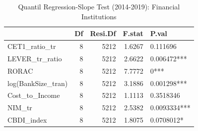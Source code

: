 \begin{table}[ht]
\centering
\caption{Quantil Regression-Slope Test (2014-2019): Financial Institutions} 
\begingroup\small
\begin{tabular}{lrrrl}
  \toprule
 & Df & Resi.Df & F.stat & P.val \\ 
  \midrule
CET1\_ratio\_tr & 8 & 5212 & 1.6267 & 0.111696 \\ 
  LEVER\_tr\_ratio & 8 & 5212 & 2.6622 & 0.006472*** \\ 
  RORAC & 8 & 5212 & 7.7772 & 0*** \\ 
  log(BankSize\_tran) & 8 & 5212 & 3.1886 & 0.001298*** \\ 
  Cost\_to\_Income & 8 & 5212 & 1.1113 & 0.3518346 \\ 
  NIM\_tr & 8 & 5212 & 2.5382 & 0.0093334*** \\ 
  CBDI\_index & 8 & 5212 & 1.8075 & 0.0708012* \\ 
   \bottomrule
\end{tabular}
\endgroup
\end{table}
